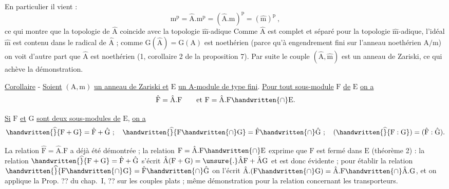 En particulier il vient :
\[
\mathrm m^{\mathrm p}=\hat{\mathrm A}.\mathrm m^{\mathrm p}=(\hat{\mathrm A}.\mathrm m)^{\mathrm p}=(\hat{\mathrm m})^{\mathrm p}\ , 
\]
ce qui montre que la topologie de $\hat{\mathrm A}$ coincide avec la topologie $\hat{\mathrm m}$-adique Comme $\hat{\mathrm A}$ est complet et séparé pour la topologie $\hat{\mathrm m}$-adique, l'idéal $\hat{\mathrm m}$ est contenu dans le radical de $\hat{\mathrm A}$ ; comme $\mathrm G(\hat{\mathrm A})=\mathrm G(\mathrm A)$ est noethérien (parce qu'à engendrement fini sur l'anneau noethérien $\mathrm A/\mathrm m$) on voit d'autre part que $\hat{\mathrm A}$ est noethérien (\handwritten{\S}1, corollaire 2 de la proposition 7). Par suite\unsure{,} le couple $(\hat{\mathrm A},\hat{\mathrm m})$ est un anneau de Zariski, ce qui achève la démonstration.

\uline{Corollaire} - \uline{Soient} $(\mathrm A,\mathrm m)$ \uline{un anneau de Zariski et} $\mathrm E$ \uline{un A-module de type fini}. \uline{Pour tout sous-module} $\mathrm F$ \uline{de} $\mathrm E$ \uline{on a}
\[
\hat{\mathrm F}=\hat{\mathrm A}.\mathrm F\qquad\text{et }\mathrm F=\hat{\mathrm A}.\mathrm F\handwritten{\cap}\mathrm E.
\]

\uline{Si} $\mathrm F$ \uline{et} $\mathrm G$ \uline{sont deux sous-modules de} $\mathrm E$, \uline{on a}
\[
\handwritten{\widehat}{\mathrm F+\mathrm G}=\hat{\mathrm F}+\hat{\mathrm G}\ ;\quad
\handwritten{\widehat}{\mathrm F\handwritten{\cap}\mathrm G}=\hat{\mathrm F}\handwritten{\cap}\hat{\mathrm G}\ ;\quad
(\handwritten{\widehat}{\mathrm F:\mathrm G})=(\hat{\mathrm F}:\hat{\mathrm G}).
\]

La relation $\hat{\mathrm F}=\hat{\mathrm A}.\mathrm F$ a déjà été démontrée ; la relation $\mathrm F=\hat{\mathrm A}.\mathrm F\handwritten{\cap}\mathrm E$ exprime que $\mathrm F$ est fermé dans $\mathrm E$ (théorème 2) : la relation $\handwritten{\widehat}{\mathrm F+\mathrm G}=\hat{\mathrm F}+\hat{\mathrm G}$ s'écrit $\hat{\mathrm A}(\mathrm F+\mathrm G)=\unsure{.}\hat{\mathrm A}\mathrm F+\hat{\mathrm A}\mathrm G$ et est donc évidente ; pour établir la relation $\handwritten{\widehat}{\mathrm F\handwritten{\cap}\mathrm G}=\hat{\mathrm F}\handwritten{\cap}\hat{\mathrm G}$ on l'écrit $\hat{\mathrm A}.(\mathrm F\handwritten{\cap}\mathrm G)=\hat{\mathrm A}.\mathrm F\handwritten{\cap}\hat{\mathrm A}.\mathrm G$, et on applique la Prop.\unsure{,} ?? du chap.~I, \handwritten{\S} ?? sur les couples plats ; même démonstration pour la relation concernant les transporteurs.

